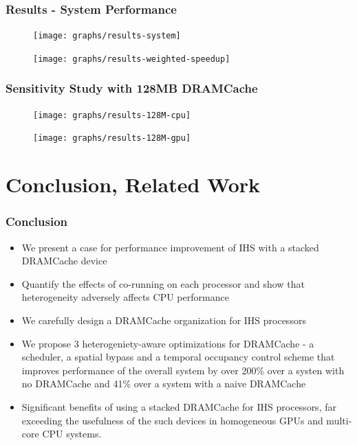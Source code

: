 \documentclass{beamer}
\begin{document}

\begin{frame}
	\frametitle{Results - System Performance}
	\begin{figure}
		\texttt{[image: graphs/results-system]}
	\end{figure}
	\begin{figure}
		\texttt{[image: graphs/results-weighted-speedup]}
	\end{figure}
\end{frame}


\begin{frame}
\frametitle{Sensitivity Study with 128MB DRAMCache}
\begin{figure}
\texttt{[image: graphs/results-128M-cpu]}
\end{figure}
\begin{figure}
	\texttt{[image: graphs/results-128M-gpu]}
\end{figure}
\end{frame}


\section{Conclusion, Related Work}

\begin{frame}[fragile] %
\frametitle{Conclusion}
\begin{itemize}
	\item We present a case for performance improvement of IHS with a stacked DRAMCache device
	\item Quantify the effects of co-running on each processor and show that heterogeneity adversely affects CPU performance 
	\item We carefully design a DRAMCache organization for IHS processors
	\item We propose 3 heterogeniety-aware optimizations for DRAMCache - a scheduler, a spatial bypass and a temporal occupancy control scheme that improves performance of the overall system by over 200\% over a systen with no DRAMCache and 41\% over a system with a naive DRAMCache
	\item Significant benefits of using a stacked DRAMCache for IHS processors, far exceeding the usefulness of the such devices in homogeneous GPUs and multi-core CPU systems.
\end{itemize}
\end{frame}
\end{document}

